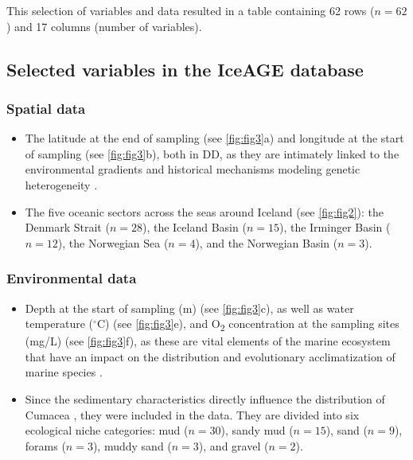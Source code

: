 This selection of variables and data resulted in a table containing 62 rows ($n=62$) and 17 columns (number of variables).

\subsection{Selected variables in the IceAGE database}
\subsubsection{Spatial data}
\begin{itemize}
\item The latitude at the end of sampling (see \autoref{fig:fig3}a) and longitude at the start of sampling (see \autoref{fig:fig3}b), both in DD, as they are intimately linked to the environmental gradients and historical mechanisms modeling genetic heterogeneity \citep{gaither2013origins}.
\item The five oceanic sectors across the seas around Iceland (see \autoref{fig:fig2}): the Denmark Strait ($n=28$), the Iceland Basin ($n=15$), the Irminger Basin ($n=12$), the Norwegian Sea ($n=4$), and the Norwegian Basin ($n=3$).
\end{itemize}

\subsubsection{Environmental data}
\begin{itemize}
\item Depth at the start of sampling (m) (see \autoref{fig:fig3}c), as well as water temperature ($^\circ$C) (see \autoref{fig:fig3}e), and O\textsubscript{2} concentration at the sampling sites (mg/L) (see \autoref{fig:fig3}f), as these are vital elements of the marine ecosystem that have an impact on the distribution and evolutionary acclimatization of marine species \citep{rex2006global, danovaro2010first}.
\item Since the sedimentary characteristics directly influence the distribution of Cumacea \citep{uhlir_adding_2021}, they were included in the data. They are divided into six ecological niche categories: mud ($n=30$), sandy mud ($n=15$), sand ($n=9$), forams ($n=3$), muddy sand ($n=3$), and gravel ($n=2$).
\end{itemize}

